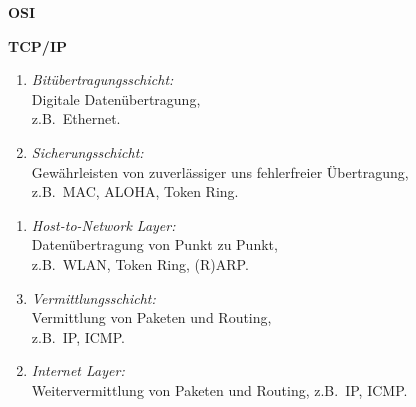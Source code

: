 \documentclass[a4paper,parskip=half*,DIV=15,fontsize=11pt]{scrartcl}
\newlength{\currentparskip}
\newenvironment{minipageparskip}
  {\setlength{\currentparskip}{\parskip} %
   \begin{minipage}{\textwidth} %
   \setlength{\parskip}{\currentparskip} %
  }
  {\end{minipage}}
\begin{document}
\begin{minipageparskip}
\begin{minipage}{0.45\textwidth}
\centering
\textbf{OSI}
\end{minipage}\hspace{0.05\textwidth}
\begin{minipage}{0.45\textwidth}
\centering
\textbf{TCP/IP}
\end{minipage}

\begin{minipage}{0.45\textwidth}
\begin{enumerate}[nolistsep]
	\item \emph{Bitübertragungsschicht:}\\ Digitale Datenübertragung,\\ z.B.\ Ethernet.
	\item \emph{Sicherungsschicht:}\\ Gewährleisten von zuverlässiger uns fehlerfreier Übertragung,\\ z.B.\ MAC, ALOHA, Token Ring.
\end{enumerate}
\end{minipage}\hspace{0.05\textwidth}
\begin{minipage}{0.45\textwidth}
\centering
\begin{enumerate}
	\item \emph{Host-to-Network Layer:}\\ Datenübertragung von Punkt zu Punkt,\\ z.B.\ WLAN, Token Ring, (R)ARP.
\end{enumerate}
\end{minipage}

\begin{minipage}{0.45\textwidth}
\begin{enumerate}
    \setcounter{enumi}{2}
    \item \emph{Vermittlungsschicht:}\\ Vermittlung von Paketen und Routing,\\ z.B.\ IP, ICMP.
\end{enumerate}
\end{minipage}\hspace{0.05\textwidth}
\begin{minipage}{0.45\textwidth}
\begin{enumerate}
    \setcounter{enumi}{1}
    \item \emph{Internet Layer:}\\ Weitervermittlung von Paketen und Routing, z.B.\ IP, ICMP.
\end{enumerate}
\end{minipage}


\end{minipageparskip}
\end{document}
